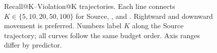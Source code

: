 \begin{table}[t]
\begin{minipage}{\columnwidth}

\end{minipage}
\end{table}


\begin{figure}[!t]
    \centering
    \caption{Recall@K--Violation@K trajectories. Each line connects
    $K\in\{5,10,20,50,100\}$ for Source, \methodlinear{}, and \methodmlp{}.
    Rightward and downward movement is preferred. Numbers label $K$ along the
    Source trajectory; all curves follow the same budget order. Axis ranges
    differ by predictor.}
    \label{fig:tradeoff}
\end{figure}

